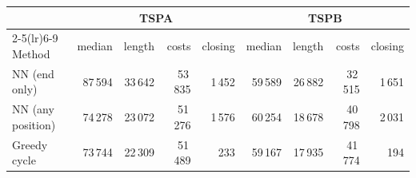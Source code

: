 \begin{tabular}{lrrrrrrrr}
\toprule
 & \multicolumn{4}{c}{TSPA} & \multicolumn{4}{c}{TSPB} \\
\cmidrule(lr){2-5}\cmidrule(lr){6-9}
Method & median & length & costs & closing & median & length & costs & closing \\
\midrule
NN (end only) & 87\,594 & 33\,642 & 53\,835 & 1\,452 & 59\,589 & 26\,882 & 32\,515 & 1\,651 \\
NN (any position) & 74\,278 & 23\,072 & 51\,276 & 1\,576 & 60\,254 & 18\,678 & 40\,798 & 2\,031 \\
Greedy cycle & 73\,744 & 22\,309 & 51\,489 & 233 & 59\,167 & 17\,935 & 41\,774 & 194 \\
\bottomrule
\end{tabular}
